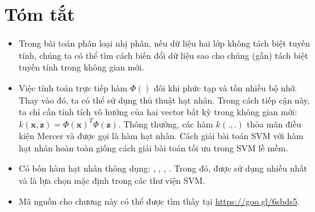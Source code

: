 \section{Tóm tắt }

\begin{itemize}
\item Trong bài toán phân loại nhị phân, nếu dữ liệu hai lớp {không tách biệt tuyến tính}, chúng ta có thể tìm cách biến đổi dữ liệu sao cho chúng (gần) tách biệt tuyến tính trong không gian mới.

\item Việc tính toán trực tiếp hàm $\Phi()$ đôi khi phức tạp và tốn nhiều bộ nhớ. Thay vào đó, ta có thể sử dụng thủ thuật hạt nhân. Trong cách tiếp cận này, ta chỉ cần tính tích vô hướng của hai vector bất kỳ trong không gian mới: $k(\mathbf{x}, \mathbf{z}) = \Phi(\mathbf{x})^T\Phi(\mathbf{z})$.
Thông thường, các hàm $k(., .)$ thỏa mãn điều kiện Mercer và được
gọi là hàm hạt nhân. Cách giải bài toán SVM với hàm hạt nhân hoàn toàn giống cách giải bài toán tối ưu trong SVM lề mềm.

\item Có bốn hàm hạt nhân thông dụng: ,
, , . Trong đó,  được sử dụng nhiều nhất và là lựa chọn mặc định trong các thư viện SVM.

\item Mã nguồn cho chương này có thể được tìm thấy tại \url{https://goo.gl/6sbds5}.

\end{itemize}







